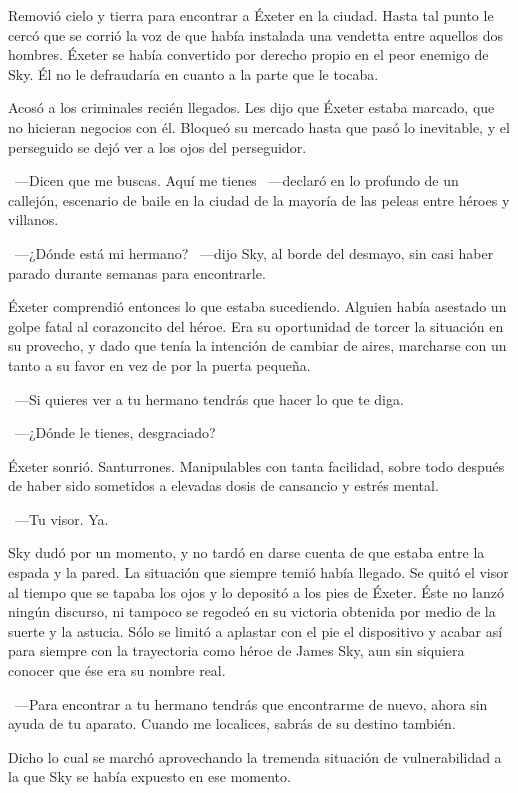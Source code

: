 Removió cielo y tierra para encontrar a Éxeter en la ciudad. Hasta tal punto le cercó que se corrió la voz de que había instalada una vendetta entre aquellos dos hombres. Éxeter se había convertido por derecho propio en el peor enemigo de Sky. Él no le defraudaría en cuanto a la parte que le tocaba.

Acosó a los criminales recién llegados. Les dijo que Éxeter estaba marcado, que no hicieran negocios con él. Bloqueó su mercado hasta que pasó lo inevitable, y el perseguido se dejó ver a los ojos del perseguidor.

~---Dicen que me buscas. Aquí me tienes ~---declaró en lo profundo de un callejón, escenario de baile en la ciudad de la mayoría de las peleas entre héroes y villanos.

~---¿Dónde está mi hermano? ~---dijo Sky, al borde del desmayo, sin casi haber parado durante semanas para encontrarle.

Éxeter comprendió entonces lo que estaba sucediendo. Alguien había asestado un golpe fatal al corazoncito del héroe. Era su oportunidad de torcer la situación en su provecho, y dado que tenía la intención de cambiar de aires, marcharse con un tanto a su favor en vez de por la puerta pequeña.

~---Si quieres ver a tu hermano tendrás que hacer lo que te diga.

~---¿Dónde le tienes, desgraciado?

Éxeter sonrió. Santurrones. Manipulables con tanta facilidad, sobre todo después de haber sido sometidos a elevadas dosis de cansancio y estrés mental.

~---Tu visor. Ya.

Sky dudó por un momento, y no tardó en darse cuenta de que estaba entre la espada y la pared. La situación que siempre temió había llegado. Se quitó el visor al tiempo que se tapaba los ojos y lo depositó a los pies de Éxeter. Éste no lanzó ningún discurso, ni tampoco se regodeó en su victoria obtenida por medio de la suerte y la astucia. Sólo se limitó a aplastar con el pie el dispositivo y acabar así para siempre con la trayectoria como héroe de James Sky, aun sin siquiera conocer que ése era su nombre real.

~---Para encontrar a tu hermano tendrás que encontrarme de nuevo, ahora sin ayuda de tu aparato. Cuando me localices, sabrás de su destino también.

Dicho lo cual se marchó aprovechando la tremenda situación de vulnerabilidad a la que Sky se había expuesto en ese momento.


